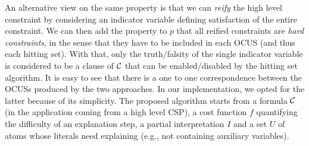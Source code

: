 {An alternative view on the same property is that we can \emph{reify} the high level constraint by considering an indicator variable defining satisfaction of the entire constraint. 
We can then add the property to $p$ that all reified constraints are \emph{hard constraints}, in the sense that they have to be included in each OCUS (and thus each hitting set). With that, only the truth/falsity of the single indicator variable is considered to be a clause of $\mathcal{C} $ that can be enabled/disabled by the hitting set algorithm. 
It is easy to see that there is a one to one correspondence between the OCUSs produced by the two approaches. In our implementation, we opted for the latter because of its simplicity. 
}
The proposed algorithm starts from a formula $\mathcal{C} $ (in the application coming from a high level CSP), a cost function $f$ quantifying the difficulty of an explanation step, a partial interpretation $I$ and a set $U$ of atoms whose literals need explaining (e.g., not containing auxiliary variables). 

